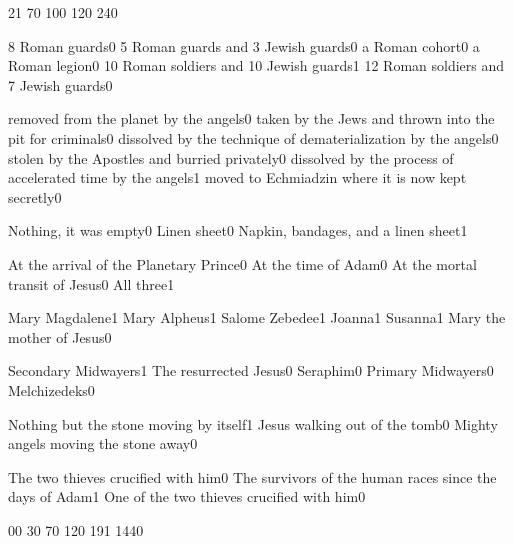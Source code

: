{2}{1}
{7}{0}
{10}{0}
{12}{0}
{24}{0}
\qstop

{8 Roman guards}{0}
{5 Roman guards and 3 Jewish guards}{0}
{a Roman cohort}{0}
{a Roman legion}{0}
{10 Roman soldiers and 10 Jewish guards}{1}
{12 Roman soldiers and 7 Jewish guards}{0}
\qstop


{removed from the planet by the angels}{0}
{taken by the Jews and thrown into the pit for criminals}{0}
{dissolved by the technique of dematerialization by the angels}{0}
{stolen by the Apostles and burried privately}{0}
{dissolved by the process of accelerated time by the angels}{1}
{moved to Echmiadzin where it is now kept secretly}{0}
\qstop

{Nothing, it was empty}{0}
{Linen sheet}{0}
{Napkin, bandages, and a linen sheet}{1}
\qstop

{At the arrival of the Planetary Prince}{0}
{At the time of Adam}{0}
{At the mortal transit of Jesus}{0}
{All three}{1}
\qstop

{Mary Magdalene}{1}
{Mary Alpheus}{1}
{Salome Zebedee}{1}
{Joanna}{1}
{Susanna}{1}
{Mary the mother of Jesus}{0}
\qstop

{Secondary Midwayers}{1}
{The resurrected Jesus}{0}
{Seraphim}{0}
{Primary Midwayers}{0}
{Melchizedeks}{0}
\qstop

{Nothing but the stone moving by itself}{1}
{Jesus walking out of the tomb}{0}
{Mighty angels moving the stone away}{0}
\qstop

{The two thieves crucified with him}{0}
{The survivors of the human races since the days of Adam}{1}
{One of the two thieves crucified with him}{0}
\qstop


{0}{0}
{3}{0}
{7}{0}
{12}{0}
{19}{1}
{144}{0}
\qstop

